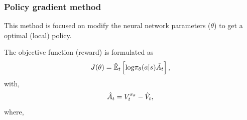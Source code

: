 \begin{frame}
	\frametitle{Policy gradient method}
	This method is focused on modify the neural network parameters {\color{gray} ($\theta$)} to get a optimal {\color{gray} (local)} policy\footnotemark[1].

	\begin{center}
		\begin{minipage}{8cm}
			\begin{myexampleblock}[8cm]{}
				The objective function {\color{gray} (reward)} is formulated as\footnotemark[1]				
				\begin{equation*}
					J(\theta) = \hat{\mathbb{E}}_{t} \left[ \mathrm{log} \pi_\theta (a|s) \hat{A}_{t}  \right],			
				\end{equation*}
				with,
				\begin{equation*}
					\hat{A}_{t} = V^{\pi_{\theta}}_{t}  - \hat{V}_{t}, 
				\end{equation*}
				where,
				\newline
				\hspace{10px}
			\end{myexampleblock}
		\end{minipage}
	\end{center}
\end{frame}

